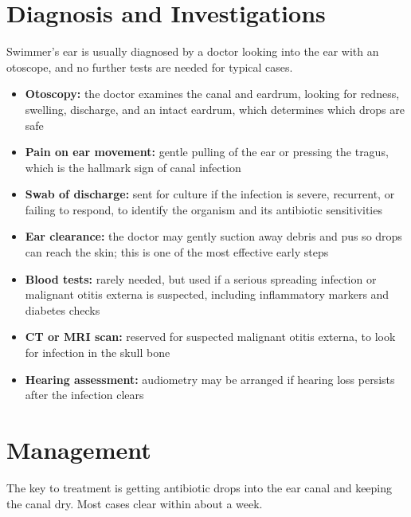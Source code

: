 \section*{Diagnosis and Investigations}
Swimmer's ear is usually diagnosed by a doctor looking into the ear with an otoscope, and no further tests are needed for typical cases.

\begin{itemize}
    \item \textbf{Otoscopy:} the doctor examines the canal and eardrum, looking for redness, swelling, discharge, and an intact eardrum, which determines which drops are safe
    \item \textbf{Pain on ear movement:} gentle pulling of the ear or pressing the tragus, which is the hallmark sign of canal infection
    \item \textbf{Swab of discharge:} sent for culture if the infection is severe, recurrent, or failing to respond, to identify the organism and its antibiotic sensitivities
    \item \textbf{Ear clearance:} the doctor may gently suction away debris and pus so drops can reach the skin; this is one of the most effective early steps
    \item \textbf{Blood tests:} rarely needed, but used if a serious spreading infection or malignant otitis externa is suspected, including inflammatory markers and diabetes checks
    \item \textbf{CT or MRI scan:} reserved for suspected malignant otitis externa, to look for infection in the skull bone
    \item \textbf{Hearing assessment:} audiometry may be arranged if hearing loss persists after the infection clears
\end{itemize}

\section*{Management}
The key to treatment is getting antibiotic drops into the ear canal and keeping the canal dry. Most cases clear within about a week.

